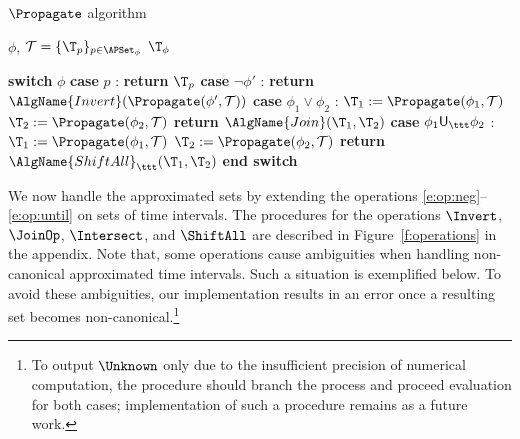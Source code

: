 \documentclass[paper]{ieice}
\newcommand{\Until}{\mathsf{U}}
\begin{document}
\begin{algorithm}[t]
\caption{$\Propagate$ algorithm}
\label{a:propagate}

\begin{algorithmic}[1]
  \REQUIRE $\phi$, $\mathcal{T} = \{\T_p\}_{p \in \APSet_\phi}$
  \ENSURE $\T_\phi$

  \STATE \textbf{switch} $\phi$
  \STATE \textbf{case} $p$ : 
  \STATE \qquad \textbf{return} {$\T_p$}
  \STATE \textbf{case} $\neg \phi'$ : 
  \STATE \qquad \textbf{return} $\AlgName{Invert}(\Propagate(\phi', \mathcal{T}))$
  \STATE \textbf{case} $\phi_1 \lor \phi_2$ : 
  \STATE \qquad $\T_{1} := \Propagate(\phi_1, \mathcal{T})$
  \STATE \qquad $\T_{2} := \Propagate(\phi_2, \mathcal{T})$
  \STATE \qquad \textbf{return} {$\AlgName{Join}(\T_{1}, \T_{2})$}
  \STATE \textbf{case} $\phi_1 \Until_\ttt \phi_2$ : 
  \STATE \qquad $\T_{1} := \Propagate(\phi_1, \mathcal{T})$
  \STATE \qquad $\T_{2} := \Propagate(\phi_2, \mathcal{T})$
\STATE \qquad \textbf{return} $\AlgName{ShiftAll}_\ttt(\T_{1}, \T_{2})$
  \STATE \textbf{end switch}
\end{algorithmic}
\end{algorithm}

We now handle the approximated sets by extending the operations \eqref{e:op:neg}--\eqref{e:op:until} on sets of time intervals.
The procedures for the operations $\Invert$, $\JoinOp$, $\Intersect$, and $\ShiftAll$ are described in Figure~\ref{f:operations} in the appendix.
Note that, some operations cause ambiguities when handling non-canonical approximated time intervals.
Such a situation is exemplified below.
To avoid these ambiguities, our implementation results in an error once a resulting set becomes non-canonical.\footnote{
To output $\Unknown$ only due to the insufficient precision of numerical computation,
the procedure should branch the process and proceed evaluation for both cases;
implementation of such a procedure remains as a future work.}
\end{document}
